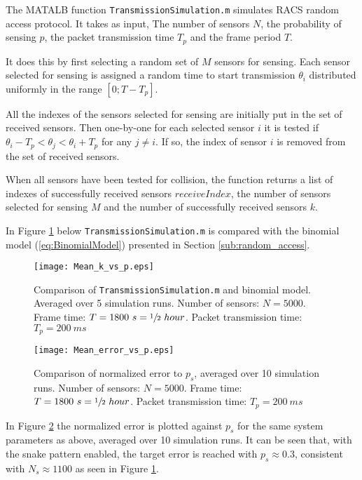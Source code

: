 \documentclass[Main]{subfiles}
\begin{document}
		The MATALB function \texttt{TransmissionSimulation.m} simulates RACS random access protocol.
		It takes as input, The number of sensors $N$, the probability of sensing $p$, the packet transmission time $T_p$ and the frame period $T$.

		It does this by first selecting a random set of $M$ sensors for sensing.
		Each sensor selected for sensing is assigned a random time to start transmission $\theta_i$ distributed uniformly in the range $[0 ; T - T_p]$.

		All the indexes of the sensors selected for sensing are initially put in the set of received sensors.
		Then one-by-one for each selected sensor $i$ it is tested if 
		$\theta_i - T_p < \theta_j < \theta_i + T_p$
		for any
		$j \neq i$.
		If so, the index of sensor $i$ is removed from the set of received sensors.

		When all sensors have been tested for collision, the function returns a list of indexes of successfully received sensors $receiveIndex$, the number of sensors selected for sensing $M$ and the number of successfully received sensors $k$.

		In Figure \ref{fig:Mean_k_vs_p} below \texttt{TransmissionSimulation.m} is compared with the binomial model (\ref{eq:BinomialModel}) presented in Section \ref{sub:random_access}.

		\begin{figure}[H]
			\centering 
			\texttt{[image: Mean\_k\_vs\_p.eps]}
			\caption{Comparison of \texttt{TransmissionSimulation.m} and binomial model. Averaged over 5 simulation runs.
			Number of sensors: $N = 5000$.
			Frame time: $T = 1800\ s = \sfrac{1}{2}\ hour$.
			Packet transmission time: $T_p = 200\ ms$}
			\label{fig:Mean_k_vs_p}
		\end{figure}

		\begin{figure}[H]
			\centering 
			\texttt{[image: Mean\_error\_vs\_p.eps]}
			\caption{Comparison of normalized error to $p_s$, averaged over 10 simulation runs.
			Number of sensors: $N = 5000$.
			Frame time: $T = 1800\ s = \sfrac{1}{2}\ hour$.
			Packet transmission time: $T_p = 200\ ms$}
			\label{fig:Mean_error_vs_p}
		\end{figure}
	
		\vspace{-3mm} 
		In Figure \ref{fig:Mean_error_vs_p} the normalized error is plotted against $p_s$ for the same system parameters as above, averaged over 10 simulation runs.
		It can be seen that, with the snake pattern enabled, the target error is reached with $p_s \approx 0.3$, consistent with $N_s \approx 1100$ as seen in Figure \ref{fig:Mean_k_vs_p}.
\end{document}
